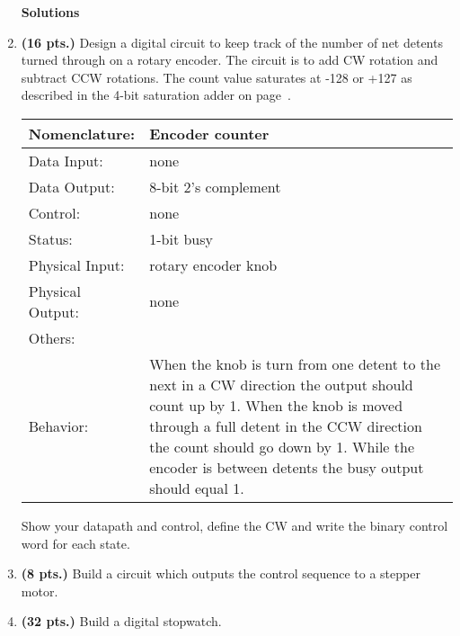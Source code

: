 \begin{enumerate}
\begin{onlysolution} \textbf{Solutions} \itshape {
\begin{figure}[ht]
\end{figure}
} \end{onlysolution} 



\item\textbf{ (16 pts.)} Design a digital circuit to keep track of the
number of net detents turned through on a rotary encoder.  The circuit
is to add CW rotation and subtract CCW rotations.  The count value
saturates at -128 or +127 as described in the 4-bit saturation
adder on page~\pageref{page:saturation}.

\begin{tabular}{|l|p{3.5in}|} \hline
Nomenclature:  & Encoder counter         \\ \hline
Data Input:    & none         \\ \hline
Data Output:   & 8-bit 2's complement   \\ \hline
Control:       & none           \\ \hline
Status:        & 1-bit busy                                   \\ \hline
Physical Input:& rotary encoder knob        \\ \hline
Physical Output:& none          \\ \hline
Others:        &            \\ \hline
Behavior:      & When the knob is turn from one detent to the next in
a CW direction the output should count up by 1.  When the knob is moved
through a full detent in the CCW direction the count should go down
by 1.  While the encoder is between detents the busy output
should equal 1. \\ \hline
\end{tabular}

Show your datapath and control, define the CW and write the binary control
word for each state.

\item\textbf{ (8 pts.)} Build a circuit which outputs the control sequence
to a stepper motor.

\item\textbf{ (32 pts.)} Build a digital stopwatch.


\end{enumerate}
